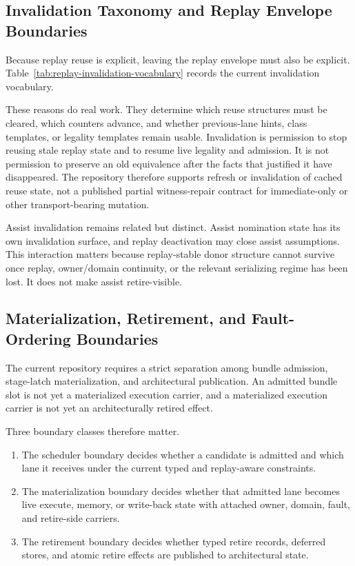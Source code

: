 \documentclass[twocolumn]{article}
\begin{document}
\subsection{Invalidation Taxonomy and Replay Envelope Boundaries}

Because replay reuse is explicit, leaving the replay envelope must also be explicit. Table~\ref{tab:replay-invalidation-vocabulary} records the current invalidation vocabulary.



These reasons do real work. They determine which reuse structures must be cleared, which counters advance, and whether previous-lane hints, class templates, or legality templates remain usable. Invalidation is permission to stop reusing stale replay state and to resume live legality and admission. It is not permission to preserve an old equivalence after the facts that justified it have disappeared. The repository therefore supports refresh or invalidation of cached reuse state, not a published partial witness-repair contract for immediate-only or other transport-bearing mutation.

Assist invalidation remains related but distinct. Assist nomination state has its own invalidation surface, and replay deactivation may close assist assumptions. This interaction matters because replay-stable donor structure cannot survive once replay, owner/domain continuity, or the relevant serializing regime has been lost. It does not make assist retire-visible.


\subsection{Materialization, Retirement, and Fault-Ordering Boundaries}

The current repository requires a strict separation among bundle admission, stage-latch materialization, and architectural publication. An admitted bundle slot is not yet a materialized execution carrier, and a materialized execution carrier is not yet an architecturally retired effect.

Three boundary classes therefore matter.

\begin{enumerate}
\item The scheduler boundary decides whether a candidate is admitted and which lane it receives under the current typed and replay-aware constraints.
\item The materialization boundary decides whether that admitted lane becomes live execute, memory, or write-back state with attached owner, domain, fault, and retire-side carriers.
\item The retirement boundary decides whether typed retire records, deferred stores, and atomic retire effects are published to architectural state.
\end{enumerate}
\end{document}
